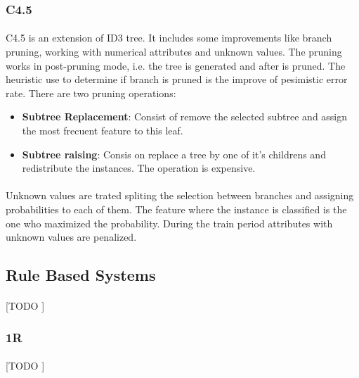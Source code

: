 \documentclass{article}
\begin{document}
			\subsubsection{C4.5}
			\label{sec:c45-trees}

				\paragraph{}
				C4.5 is an extension of ID3 tree. It includes some improvements like branch pruning, working with numerical attributes and unknown values. The pruning works in post-pruning mode, i.e. the tree is generated and after is pruned. The heuristic use to determine if branch is pruned is the improve of pesimistic error rate. There are two pruning operations:

				\begin{itemize}
					\item \textbf{Subtree Replacement}: Consist of remove the selected subtree and assign the most frecuent feature to this leaf.
					\item \textbf{Subtree raising}: Consis on replace a tree by one of it's childrens and redistribute the instances. The operation is expensive.
				\end{itemize}

				\paragraph{}
				Unknown values are trated spliting the selection between branches and assigning probabilities to each of them. The feature where the instance is classified is the one who maximized the probability. During the train period attributes with unknown values are penalized.

		\subsection{Rule Based Systems}
		\label{sec:decision-trees}

			\paragraph{}
			[TODO ]

			\subsubsection{1R}
			\label{sec:1r-rule-based}

				\paragraph{}
				[TODO ]
\end{document}
